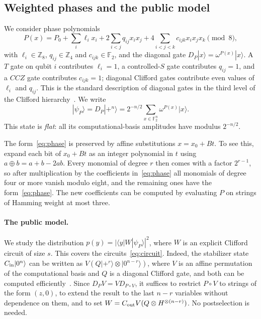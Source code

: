 \documentclass[a4paper,onecolumn,11pt,unpublished]{quantumarticle}
\theoremstyle{plain}
\theoremstyle{remark}
\newcommand{\F}{\mathbb{F}_2}
\newcommand{\Z}{\mathbb{Z}}
\newcommand{\ket}[1]{|#1\rangle}
\newcommand{\bra}[1]{\langle #1|}
\begin{document}
\subsection{Weighted phases and the public model}

We consider phase polynomials
\begin{equation}\label{eq:phase}
P(x)=P_0+\sum_i\ell_ix_i+2\sum_{i<j}q_{ij}x_ix_j+4\sum_{i<j<k}c_{ijk}x_ix_jx_k \pmod 8,
\end{equation}
with $\ell_i\in\Z_8$, $q_{ij}\in\Z_4$ and $c_{ijk}\in\F$, and the diagonal gate $D_P\ket{x}=\omega^{P(x)}\ket{x}$. A $T$ gate on qubit $i$ contributes $\ell_i=1$, a controlled-$S$ gate contributes $q_{ij}=1$, and a $CCZ$ gate contributes $c_{ijk}=1$; diagonal Clifford gates contribute even values of $\ell_i$ and $q_{ij}$. This is the standard description of diagonal gates in the third level of the Clifford hierarchy~\cite{CGK17}. We write
\[
\ket{\psi_P}=D_P\ket{+^n}=2^{-n/2}\sum_{x\in\F^n}\omega^{P(x)}\ket{x}.
\]
This state is \emph{flat}: all its computational-basis amplitudes have modulus $2^{-n/2}$.

The form~\eqref{eq:phase} is preserved by affine substitutions $x=x_0+Bt$. To see this, expand each bit of $x_0+Bt$ as an integer polynomial in $t$ using $a\oplus b=a+b-2ab$. Every monomial of degree $r$ then comes with a factor $2^{r-1}$, so after multiplication by the coefficients in~\eqref{eq:phase} all monomials of degree four or more vanish modulo eight, and the remaining ones have the form~\eqref{eq:phase}. The new coefficients can be computed by evaluating $P$ on strings of Hamming weight at most three.

\paragraph{The public model.}
We study the distribution $p(y)=|\bra{y}W\ket{\psi_P}|^2$, where $W$ is an explicit Clifford circuit of size $s$. This covers the circuits~\eqref{eq:circuit}. Indeed, the stabilizer state $C_{\rm in}\ket{0^n}$ can be written as $V(Q\ket{+^r}\otimes\ket{0^{n-r}})$, where $V$ is an affine permutation of the computational basis and $Q$ is a diagonal Clifford gate, and both can be computed efficiently~\cite{DD03}. Since $D_PV=VD_{P\circ V}$, it suffices to restrict $P\circ V$ to strings of the form $(z,0)$, to extend the result to the last $n-r$ variables without dependence on them, and to set $W=C_{\rm out}V(Q\otimes H^{\otimes(n-r)})$. No postselection is needed.
\end{document}
